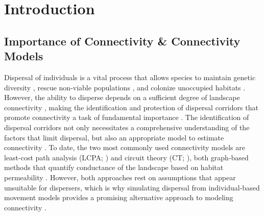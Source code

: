 \documentclass[abstract=on,10pt,a4paper,bibliography=totocnumbered]{article}
\begin{document}
\newpage
{}

\linenumbers

\section{Introduction}

\subsection{Importance of Connectivity \& Connectivity Models}
Dispersal of individuals is a vital process that allows species to maintain
genetic diversity \citep{Perrin.1999, Perrin.2000, Frankham.2002, Leigh.2012,
Baguette.2013}, rescue non-viable populations \citep{Brown.1977}, and colonize
unoccupied habitats \citep{Hanski.1999b, MacArthur.2001}. However, the ability
to disperse depends on a sufficient degree of landscape connectivity
\citep{Fahrig.2003, Clobert.2012}, making the identification and protection of
dispersal corridors that promote connectivity a task of fundamental importance
\citep{Nathan.2008, Doerr.2011, Rudnick.2012}. The identification of dispersal
corridors not only necessitates a comprehensive understanding of the factors
that limit dispersal, but also an appropriate model to estimate connectivity
\citep{Baguette.2013, Vasudev.2015, Hofmann.2021}. To date, the two most
commonly used connectivity models are least-cost path analysis (LCPA;
\citealp{Adriaensen.2003}) and circuit theory (CT; \citealp{McRae.2006,
McRae.2008}), both graph-based methods that quantify conductance of the
landscape based on habitat permeability \citep{Zeller.2012}. However, both
approaches rest on assumptions that appear unsuitable for dispersers, which is
why  simulating dispersal from individual-based movement models provides a
promising alternative approach to modeling connectivity \citep{Diniz.2019}.

\end{document}
